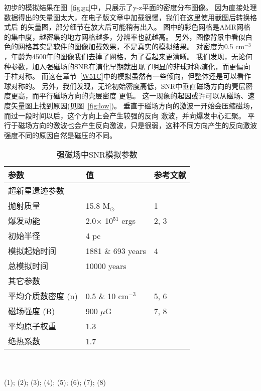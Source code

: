 初步的模拟结果在图~\ref{fig:gc}中，只展示了y-z平面的密度分布图像。
因为直接处理数据得出的矢量图太大，在电子版文章中加载很慢，我们在这里使用截图后转换格式后
的矢量图，部分细节在放大后可能稍有出入。
图中的彩色网格是AMR网格的集中度，越密集的地方网格越多，分辨率也就越高。
另外，图像背景中看似白色的网格其实是软件的图像加载效果，不是真实的模拟结果。
对密度为0.5 cm$^{-3}$，年龄为4500年的图像我们去掉了网格，为了看起来更清晰。
我们发现，无论何种参数，加入强磁场的SNR在演化早期就出现了明显的非球对称演化，而更偏向
于柱对称。
而这在章节~\ref{W51C}中的模拟虽然有一些倾向，但整体还是可以看作球对称的。
另外，我们发现，无论初始密度高低，SNR中垂直磁场方向的壳层密度更高，而平行磁场方向的壳层密度
更低。
这一现象的起因或许可以从磁场、速度矢量图上找到原因(见图~\ref{fig:low})。
垂直于磁场方向的激波一开始会压缩磁场，而过一段时间以后，这个方向上会产生较强的反向
激波，并向爆发中心汇聚。
平行于磁场方向的激波也会产生反向激波，只是很弱，这种不同方向产生的反向激波
强度不同的原因自然是磁压的不同。

\begin{table}
  \caption{强磁场中SNR模拟参数}
  \label{table:parameters}
  \centering
  \begin{tabular}{l l l}
      \hline\hline
      参数                      & 值            & 参考文献               \\
      \hline
      超新星遗迹参数\\
      \hline
      抛射质量                    & 15.8 M$_{\odot}$ & 1\\
      爆发动能                    & 2.0$\times$ 10$^{51}$ ergs & 2, 3\\
      初始半径                    & 4 pc             &\\
      模拟起始时间                & 1881 $\&$ 693 years        & 4\\
      总模拟时间                  & 10000 years\\
      \hline
      其它参数\\
      \hline
      平均介质数密度 (n)         & 0.5 $\&$ 10 cm$^{-3}$   & 5, 6\\
      磁场强度 (B)              & 900 $\mu$G   & 7, 8\\
      平均原子权重              & 1.3              &\\
      绝热系数                  & 1.7              &\\
      \hline
  \end{tabular}\\
  ~\\
  (1)\citealt{Sukhbold2016}; (2)\citealt{Poznanski2013}; (3)\citealt{Mueller2016a}; (4)\citealt{Leahy2017a};
  (5)\citealt{Nakanishi2006}; (6)\citealt{Nakanishi2016}; (7)\citealt{Haverkorn2015}; (8)\citealt{Ferriere2009}
\end{table}

